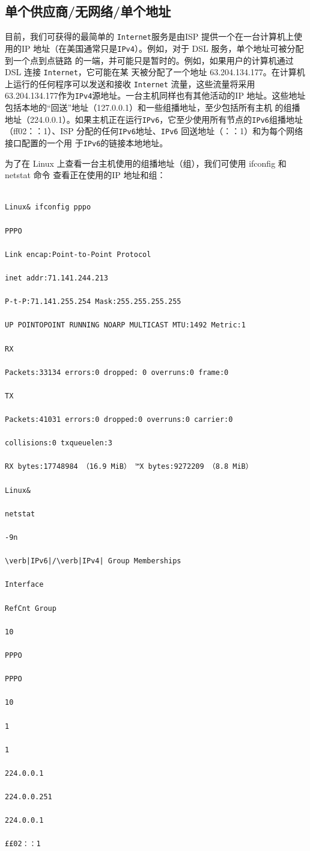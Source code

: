 \subsection{单个供应商/无网络/单个地址}
目前，我们可获得的最简单的 \verb|Internet|服务是由ISP 提供一个在一台计算机上使用的IP
地址（在美国通常只是\verb|IPv4|）。例如，对于 DSL 服务，单个地址可被分配到一个点到点链路
的一端，并可能只是暂时的。例如，如果用户的计算机通过DSL 连接 \verb|Internet|，它可能在某
天被分配了一个地址 63.204.134.177。在计算机上运行的任何程序可以发送和接收 \verb|Internet|
流量，这些流量将采用63.204.134.177作为\verb|IPv4|源地址。一台主机同样也有其他活动的IP
地址。这些地址包括本地的“回送”地址（127.0.0.1）和一些组播地址，至少包括所有主机
的组播地址（224.0.0.1）。如果主机正在运行\verb|IPv6|，它至少使用所有节点的\verb|IPv6|组播地址
（ff02：：1）、ISP 分配的任何\verb|IPv6|地址、\verb|IPv6| 回送地址（：：1）和为每个网络接口配置的一个用
于\verb|IPv6|的链接本地地址。

为了在 Linux 上查看一台主机使用的组播地址（组），我们可使用 ifconfig 和 netstat 命令
查看正在使用的IP 地址和组：

\begin{verbatim}
    
Linux& ifconfig pppo

PPPO

Link encap:Point-to-Point Protocol

inet addr:71.141.244.213

P-t-P:71.141.255.254 Mask:255.255.255.255

UP POINTOPOINT RUNNING NOARP MULTICAST MTU:1492 Metric:1

RX

Packets:33134 errors:0 dropped: 0 overruns:0 frame:0

TX

Packets:41031 errors:0 dropped:0 overruns:0 carrier:0

collisions:0 txqueuelen:3

RX bytes:17748984 （16.9 MiB） ™X bytes:9272209 （8.8 MiB）

Linux&

netstat

-9n

\verb|IPv6|/\verb|IPv4| Group Memberships

Interface

RefCnt Group

10

PPPO

PPPO

10

1

1

224.0.0.1

224.0.0.251

224.0.0.1

££02：：1
\end{verbatim}

